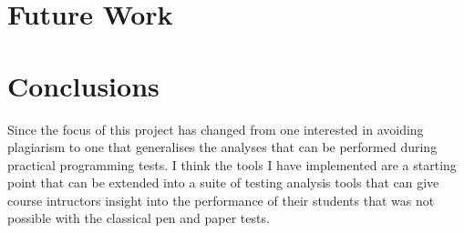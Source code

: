 \documentclass[twocolumn]{article}
\begin{document}
\section{Future Work}


\section{Conclusions}
Since the focus of this project has changed from one interested in avoiding
plagiarism to one that generalises the analyses that can be performed during
practical programming tests. I think the tools I have implemented are a
starting point that can be extended into a suite of testing analysis tools that
can give course intructors insight into the performance of their students that
was not possible with the classical pen and paper tests.



\end{document}
